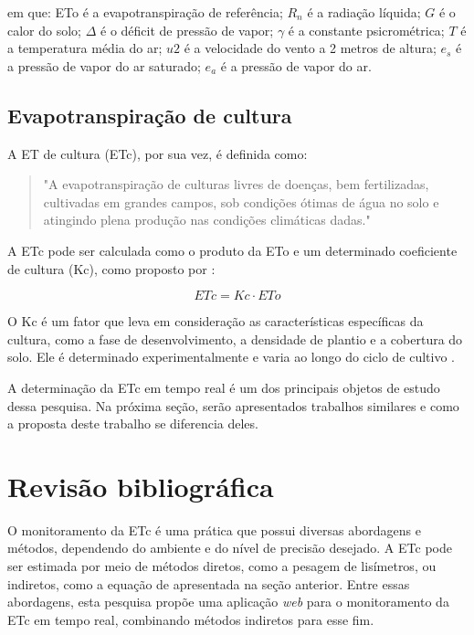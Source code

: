 \noindent em que: ETo é a evapotranspiração de referência; $R_n$ é a radiação líquida; $G$ é o calor do solo; $\Delta$ é o déficit de pressão de vapor; $\gamma$ é a constante psicrométrica; $T$ é a temperatura média do ar; $u2$ é a velocidade do vento a 2 metros de altura; $e_s$ é a pressão de vapor do ar saturado; $e_a$ é a pressão de vapor do ar.

\subsection{Evapotranspiração de cultura}

A ET de cultura (ETc), por sua vez, é definida como:

\begin{quote}
  "A evapotranspiração de culturas livres de doenças, bem fertilizadas, cultivadas em grandes campos, sob condições ótimas de água no solo e atingindo plena produção nas condições climáticas dadas." \parencite[{p. 7}]{Allen_evapotranspiration1998}
\end{quote}

A ETc pode ser calculada como o produto da ETo e um determinado coeficiente de cultura (Kc), como proposto por \textcite{Allen_evapotranspiration1998}:

\begin{equation}
ETc = Kc \cdot ETo
\end{equation}

O Kc é um fator que leva em consideração as características específicas da cultura, como a fase de desenvolvimento, a densidade de plantio e a cobertura do solo. Ele é determinado experimentalmente e varia ao longo do ciclo de cultivo \parencite{bernardo_irrigacao2008}.

A determinação da ETc em tempo real é um dos principais objetos de estudo dessa pesquisa. Na próxima seção, serão apresentados trabalhos similares e como a proposta deste trabalho se diferencia deles.

\section{Revisão bibliográfica}

O monitoramento da ETc é uma prática que possui diversas abordagens e métodos, dependendo do ambiente e do nível de precisão desejado. A ETc pode ser estimada por meio de métodos diretos, como a pesagem de lisímetros, ou indiretos, como a equação de \textcite{Allen_evapotranspiration1998} apresentada na seção anterior. Entre essas abordagens, esta pesquisa propõe uma aplicação \textit{web} para o monitoramento da ETc em tempo real, combinando métodos indiretos para esse fim.

